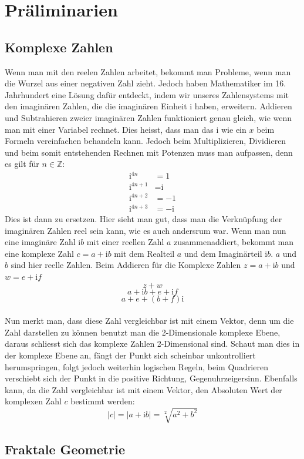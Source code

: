 \section{Präliminarien}
\subsection{Komplexe Zahlen}
Wenn man mit den reelen Zahlen arbeitet, bekommt man Probleme, wenn man die Wurzel aus einer negativen Zahl zieht. Jedoch haben Mathematiker im 16. Jahrhundert eine Lösung dafür entdeckt, indem wir unseres Zahlensystems mit den imaginären Zahlen, die die imaginären Einheit i haben, erweitern. Addieren und Subtrahieren zweier imaginären Zahlen funktioniert genau gleich, wie wenn man mit einer Variabel rechnet. Dies heisst, dass man das i wie ein $x$ beim Formeln vereinfachen behandeln kann. Jedoch beim Multiplizieren, Dividieren und beim somit entstehenden Rechnen mit Potenzen muss man aufpassen, denn es gilt für $n \in \mathbb{Z}$:
\begin{align*}
 \text{i}^{4n} &= 1 \\
\text{i}^{4n+1} &= \text{i} \\
\text{i}^{4n+2} &= -1 \\
\text{i}^{4n+3} &= -\text{i} 
\end{align*}
Dies ist dann zu ersetzen. Hier sieht man gut, dass man die Verknüpfung der imaginären Zahlen reel sein kann, wie es auch andersrum war. Wenn man nun eine imaginäre Zahl $\text{i}b$ mit einer reellen Zahl $a$ zusammenaddiert, bekommt man eine komplexe Zahl  $c=a+\text{i}b$ mit dem Realteil $a$ und dem Imaginärteil $\text{i}b$. $a$ und $b$ sind hier reelle Zahlen. Beim Addieren für die Komplexe Zahlen $z=a+\text{i}b$ und $w=e+\text{i}f$
\[z+w\]
\[a+\text{i}b+e+\text{i}f\]
\[a+e+(b+f)\text{i}\]
\\
Nun merkt man, dass diese Zahl vergleichbar ist mit einem Vektor, denn um die Zahl darstellen zu können benutzt man die 2-Dimensionale komplexe Ebene, daraus schliesst sich das komplexe Zahlen 2-Dimensional sind. Schaut man dies in der komplexe Ebene an, fängt der Punkt sich scheinbar unkontrolliert herumspringen, folgt jedoch weiterhin logischen Regeln, beim Quadrieren verschiebt sich der Punkt in die positive Richtung, Gegenuhrzeigersinn. Ebenfalls kann, da die Zahl vergleichbar ist mit einem Vektor, den Absoluten Wert der komplexen Zahl $c$ bestimmt  werden:
\[|c| = |a+\text{i}b| = \sqrt[2]{a^2+b^2} \]

\subsection{Fraktale Geometrie}
